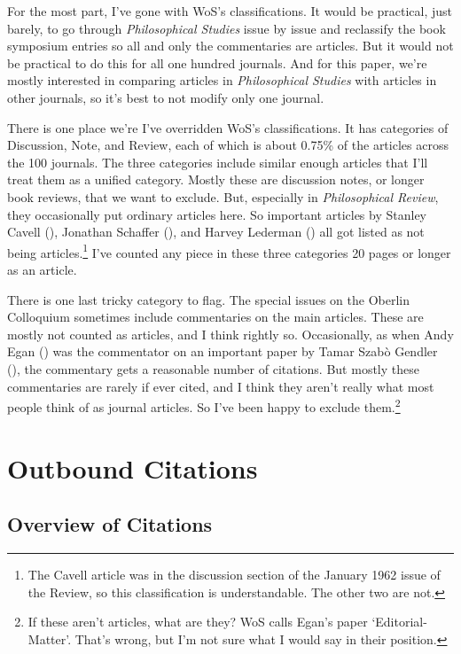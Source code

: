 \documentclass[
  10pt,
  letterpaper,
  DIV=11,
  numbers=noendperiod,
  twoside]{scrartcl}
\begin{document}
For the most part, I've gone with WoS's classifications. It would be
practical, just barely, to go through \emph{Philosophical Studies} issue
by issue and reclassify the book symposium entries so all and only the
commentaries are articles. But it would not be practical to do this for
all one hundred journals. And for this paper, we're mostly interested in
comparing articles in \emph{Philosophical Studies} with articles in
other journals, so it's best to not modify only one journal.

There is one place we're I've overridden WoS's classifications. It has
categories of Discussion, Note, and Review, each of which is about
0.75\% of the articles across the 100 journals. The three categories
include similar enough articles that I'll treat them as a unified
category. Mostly these are discussion notes, or longer book reviews,
that we want to exclude. But, especially in \emph{Philosophical Review},
they occasionally put ordinary articles here. So important articles by
Stanley Cavell (), Jonathan
Schaffer (), and Harvey Lederman
() all got listed as not being
articles.\footnote{The Cavell article was in the discussion section of
  the January 1962 issue of the Review, so this classification is
  understandable. The other two are not.} I've counted any piece in
these three categories 20 pages or longer as an article.

There is one last tricky category to flag. The special issues on the
Oberlin Colloquium sometimes include commentaries on the main articles.
These are mostly not counted as articles, and I think rightly so.
Occasionally, as when Andy Egan () was the
commentator on an important paper by Tamar Szabò Gendler
(), the commentary gets a
reasonable number of citations. But mostly these commentaries are rarely
if ever cited, and I think they aren't really what most people think of
as journal articles. So I've been happy to exclude them.\footnote{If
  these aren't articles, what are they? WoS calls Egan's paper
  `Editorial-Matter'. That's wrong, but I'm not sure what I would say in
  their position.}

\section{Outbound Citations}\label{sec-overview}

\subsection{Overview of Citations}\label{sec-citations-overview}
\end{document}

